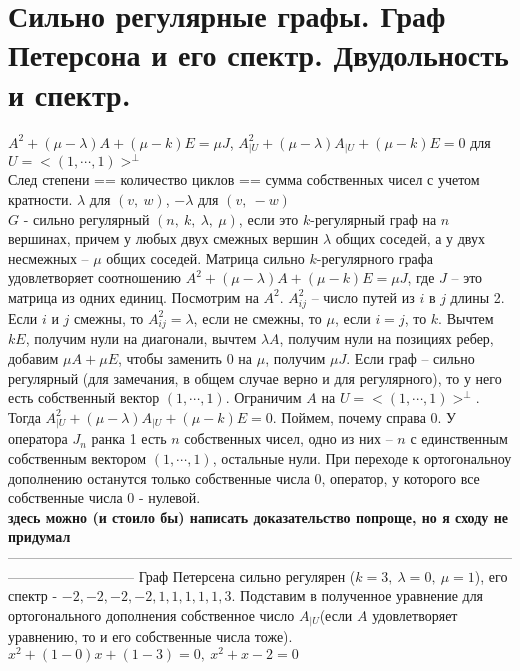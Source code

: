 \section{
	Сильно регулярные графы. Граф Петерсона и его спектр. Двудольность и спектр.
}

	
$A^2+(\mu-\lambda)A + (\mu-k)E=\mu J$,
$A_{|U}^2 + (\mu-\lambda)A_{|U} + (\mu-k)E = 0$ для 
$U = <(1,\cdots,1)>^{\bot}$\\
След степени == количество циклов == сумма собственных чисел с учетом кратности. $\lambda$ для 
$(v,\:w)$, $-\lambda$ для $(v,\:-w)$\\
	
	
$G$ - сильно регулярный $(n,~k,~\lambda,~\mu)$, если это $k$-регулярный граф на $n$ вершинах, причем у любых двух смежных вершин $\lambda$ общих соседей, а у двух несмежных -- $\mu$ общих соседей.
\thrm Матрица сильно $k$-регулярного графа удовлетворяет соотношению $A^2+(\mu-\lambda)A + (\mu-k)E=\mu J$, где $J$ -- это матрица из одних единиц.
\ethrm
\proof Посмотрим на $A^2$. $A^2_{ij}$ -- число путей из $i$ в $j$ длины 2. Если $i$ и $j$ смежны, то $A^2_{ij} = \lambda$, если не смежны, то $\mu$, если $i = j$, то $k$. Вычтем $kE$, получим нули на диагонали, вычтем $\lambda A$, получим нули на позициях ребер, добавим $\mu A + \mu E$, чтобы заменить 0 на $\mu$, получим $\mu J$.
\endproof
\rm Если граф -- сильно регулярный (для замечания, в общем случае верно и для регулярного), то у него есть собственный вектор $(1,\cdots,1)$. Ограничим $A$ на $U = <(1,\cdots,1)>^{\bot}$.
Тогда $A_{|U}^2 + (\mu-\lambda)A_{|U} + (\mu-k)E = 0$. Поймем, почему справа 0. У оператора $J_n$ ранка 1 есть $n$ собственных чисел, одно из них -- $n$ с единственным собственным вектором $(1,\cdots,1)$, остальные нули. При переходе к ортогональноу дополнению останутся только собственные числа 0, оператор, у которого все собственные числа 0 - нулевой.\\ 
\textbf{ здесь можно (и стоило бы) написать доказательство попроще, но я сходу не придумал}
\erm
---------------------------------------------------------------------------------------------------------------------------------------
\crl Граф Петерсена сильно регулярен ($k = 3,~\lambda=0,~\mu=1$), его спектр - ${-2,-2,-2,-2,1,1,1,1,1,3}$.
\ecrl
\proof
Подставим в полученное уравнение для ортогонального дополнения собственное число $A_{|U}$(если $A$ удовлетворяет уравнению, то и его собственные числа тоже). \\
$x^2+(1-0)x+(1-3)=0,~x^2+x-2=0$\\
